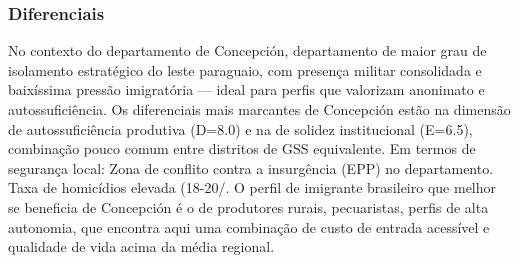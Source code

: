 \subsubsection*{Diferenciais}\label{dif-concepcion-0101}
No contexto do departamento de Concepción, departamento de maior grau de isolamento estratégico do leste paraguaio, com presença militar consolidada e baixíssima pressão imigratória — ideal para perfis que valorizam anonimato e autossuficiência. Os diferenciais mais marcantes de Concepción estão na dimensão de autossuficiência produtiva (D=8.0) e na de solidez institucional (E=6.5), combinação pouco comum entre distritos de GSS equivalente. Em termos de segurança local: Zona de conflito contra a insurgência (EPP) no departamento. Taxa de homicídios elevada (18-20/. O perfil de imigrante brasileiro que melhor se beneficia de Concepción é o de produtores rurais, pecuaristas, perfis de alta autonomia, que encontra aqui uma combinação de custo de entrada acessível e qualidade de vida acima da média regional.
